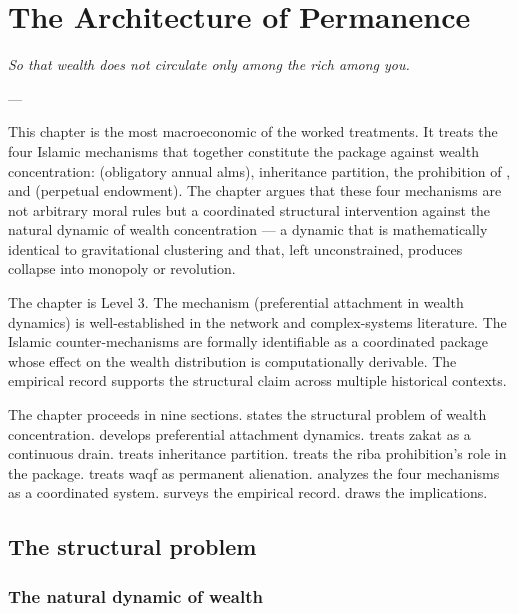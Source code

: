 \chapter{The Architecture of Permanence}
\label{ch:permanence}

\epigraph{\itshape So that wealth does not circulate only among
the rich among you.}{--- }

\noindent
This chapter is the most macroeconomic of the worked treatments. It
treats the four Islamic mechanisms that together constitute the
package against wealth concentration:  (obligatory
annual alms), inheritance partition, the prohibition of ,
and  (perpetual endowment). The chapter argues that
these four mechanisms are not arbitrary moral rules but a
coordinated structural intervention against the natural dynamic
of wealth concentration --- a dynamic that is mathematically
identical to gravitational clustering and that, left unconstrained,
produces collapse into monopoly or revolution.

The chapter is Level 3. The mechanism (preferential attachment in
wealth dynamics) is well-established in the network and complex-systems
literature. The Islamic counter-mechanisms are formally identifiable
as a coordinated package whose effect on the wealth distribution is
computationally derivable. The empirical record supports the
structural claim across multiple historical contexts.

The chapter proceeds in nine sections.  states
the structural problem of wealth concentration. 
develops preferential attachment dynamics. 
treats zakat as a continuous drain. 
treats inheritance partition.  treats
the riba prohibition's role in the package. 
treats waqf as permanent alienation. 
analyzes the four mechanisms as a coordinated system.
 surveys the empirical record.
 draws the implications.

\section{The structural problem}
\label{sec:perm-claim}

\subsection{The natural dynamic of wealth}

